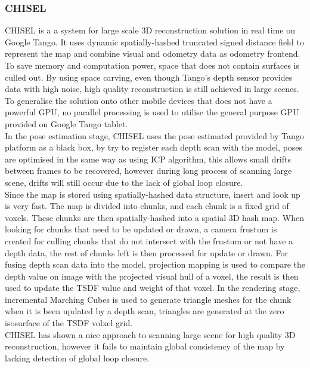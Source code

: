 \documentclass[12pt,twoside]{article}
\begin{document}
\subsubsection{CHISEL}
CHISEL\citep{klingensmith2015chisel} is a a system for large scale 3D reconstruction solution in real time on Google Tango. It uses dynamic spatially-hashed truncated signed distance field\citep{niessner2013real} to represent the map and combine visual and odometry data as odometry frontend. To save memory and computation power, space that does not contain surfaces is culled out. By using space carving, even though Tango's depth sensor provides data with high noise, high quality reconstruction is still achieved in large scenes. To generalise the solution onto other mobile devices that does not have a powerful GPU, no parallel processing is used to utilise the general purpose GPU provided on Google Tango tablet.\\
In the pose estimation stage, CHISEL uses the pose estimated provided by Tango platform as a black box, by try to register each depth scan with the model, poses are optimised in the same way as using ICP algorithm, this allows small drifts between frames to be recovered, however during long process of scanning large scene, drifts will still occur due to the lack of global loop closure.\\
Since the map is stored using spatially-hashed data structure, insert and look up is  very fast. The map is divided into chunks, and each chunk is a fixed grid of 
voxels. These chunks are then spatially-hashed into a spatial 3D hash map. When looking for chunks that need to be updated or drawn, a camera frustum is created for culling chunks that do not intersect with the frustum or not have a depth data, the rest of chunks left is then processed for update or drawn.
For fusing depth scan data into the model, projection mapping is used to compare the depth value on image with the projected visual hull of a voxel, the result is then used to update the TSDF value and weight of that voxel.
In the rendering stage, incremental Marching Cubes is used to generate triangle meshes for the chunk when it is been updated by a depth scan, triangles are generated at the zero isosurface of the TSDF volxel grid.\\
CHISEL has shown a nice approach to scanning large scene for high quality 3D reconstruction, however it fails to maintain global consistency of the map by lacking detection of global loop closure. 
\end{document}
